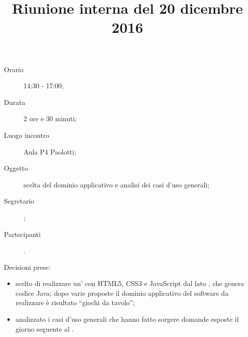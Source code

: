 


\author{\PB}
\supervisor{\MM}
\title{Riunione interna del 20 dicembre 2016}



\maketitle

\begin{description}
	\item[Orario] 14:30 - 17:00;
	\item[Durata] 2 ore e 30 minuti;
	\item[Luogo incontro] Aula P4 Paolotti;
	\item[Oggetto] scelta del dominio applicativo e analisi dei casi d'uso generali;
	\item[Segretario] \PB; 
	\item[Partecipanti] \ALL.
\end{description}
Decisioni prese:
\begin{itemize}
\item scelto di realizzare un' con HTML5, CSS3 e JavaScript dal lato , che genera codice Java; dopo varie proposte il dominio applicativo del software da realizzare è risultato “giochi da tavolo”;
\item analizzato i casi d'uso generali che hanno fatto sorgere domande esposte il giorno seguente al \GP.
\end{itemize}

